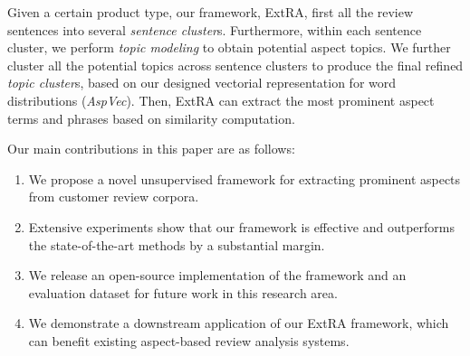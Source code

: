 Given a certain product type, our framework, ExtRA, first
all the review sentences into several \textit{sentence cluster}s.  
Furthermore, within each sentence cluster, 
we perform \textit{topic modeling} to obtain potential aspect topics.
We further cluster all the potential topics across sentence clusters to 
produce the final refined \textit{topic cluster}s, based on our designed vectorial representation for word distributions (\textit{AspVec}).
Then, ExtRA can extract the most prominent aspect terms and phrases 
based on similarity computation.
  
Our main contributions in this paper are as follows:
\begin{enumerate}
    \item We propose a novel unsupervised framework for extracting prominent aspects from customer review corpora.
    \item Extensive experiments show that our framework is effective and outperforms the state-of-the-art methods by a substantial margin.
    \item We release an open-source implementation of the framework 
    and an evaluation dataset for future work in this research area.
    \item We demonstrate a downstream application of our ExtRA framework, which can benefit existing aspect-based review analysis systems.
\end{enumerate}

